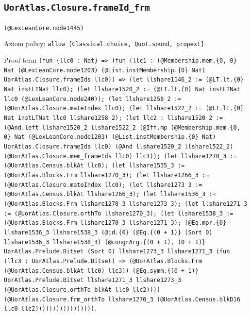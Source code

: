 \documentclass[11pt]{article}
\begin{document}
\subsection*{\texttt{UorAtlas.Closure.frameId\_frm}}
\noindent\texttt{(@LexLeanCore.node1445)}\par
\noindent Axiom policy: \texttt{allow [Classical.choice, Quot.sound, propext]}.\par
\noindent Proof term \texttt{(fun \{llc0 : Nat\} => (fun (llc1 : (@Membership.mem.\{0, 0\} Nat (@LexLeanCore.node1203) (@List.instMembership.\{0\} Nat) UorAtlas.Closure.frameIds llc0)) => (let llshare1146\_2 := (@LT.lt.\{0\} Nat instLTNat llc0); (let llshare1520\_2 := (@LT.lt.\{0\} Nat instLTNat llc0 (@LexLeanCore.node240)); (let llshare1258\_2 := (@UorAtlas.Closure.mateIndex llc0); (let llshare1522\_2 := (@LT.lt.\{0\} Nat instLTNat llc0 llshare1258\_2); (let llc2 : llshare1520\_2 := (@And.left llshare1520\_2 llshare1522\_2 (@Iff.mp (@Membership.mem.\{0, 0\} Nat (@LexLeanCore.node1203) (@List.instMembership.\{0\} Nat) UorAtlas.Closure.frameIds llc0) (@And llshare1520\_2 llshare1522\_2) (@UorAtlas.Closure.mem\_frameIds llc0) llc1)); (let llshare1270\_3 := (@UorAtlas.Census.blkAt llc0); (let llshare1535\_3 := (@UorAtlas.Blocks.Frm llshare1270\_3); (let llshare1266\_3 := (@UorAtlas.Closure.mateIndex llc0); (let llshare1273\_3 := (@UorAtlas.Census.blkAt llshare1266\_3); (let llshare1536\_3 := (@UorAtlas.Blocks.Frm llshare1270\_3 llshare1273\_3); (let llshare1271\_3 := (@UorAtlas.Closure.orthTo llshare1270\_3); (let llshare1538\_3 := (@UorAtlas.Blocks.Frm llshare1270\_3 llshare1271\_3); (@Eq.mpr.\{0\} llshare1536\_3 llshare1538\_3 (@id.\{0\} (@Eq.\{(0 + 1)\} (Sort 0) llshare1536\_3 llshare1538\_3) (@congrArg.\{(0 + 1), (0 + 1)\} UorAtlas.Prelude.Bitset (Sort 0) llshare1273\_3 llshare1271\_3 (fun (llc3 : UorAtlas.Prelude.Bitset) => (@UorAtlas.Blocks.Frm (@UorAtlas.Census.blkAt llc0) llc3)) (@Eq.symm.\{(0 + 1)\} UorAtlas.Prelude.Bitset llshare1271\_3 llshare1273\_3 (@UorAtlas.Closure.orthTo\_blkAt llc0 llc2)))) (@UorAtlas.Closure.frm\_orthTo llshare1270\_3 (@UorAtlas.Census.blkD16 llc0 llc2)))))))))))))))))}.\par
\end{document}
